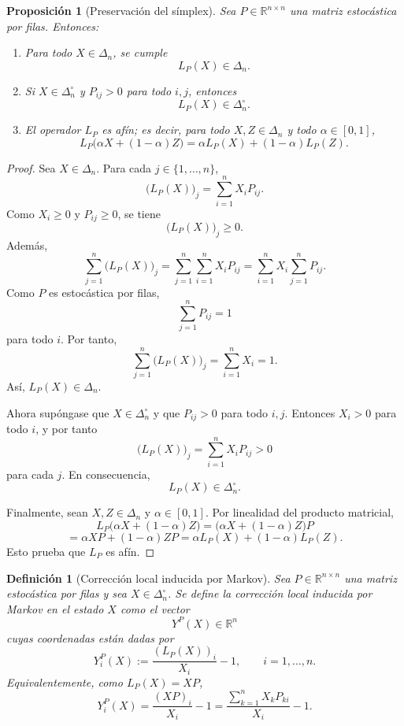 \documentclass[12pt]{article}
\newtheorem{definicion}{Definición}[section]
\newtheorem{proposicion}{Proposición}[section]
\begin{document}
\begin{proposicion}[Preservación del símplex]
Sea \(P\in\mathbb{R}^{n\times n}\) una matriz estocástica por filas. Entonces:

\begin{enumerate}[label=\textnormal{(\roman*)}]
    \item Para todo \(X\in\Delta_n\), se cumple
    \[
    L_P(X)\in\Delta_n.
    \]

    \item Si \(X\in\Delta_n^\circ\) y \(P_{ij}>0\) para todo \(i,j\), entonces
    \[
    L_P(X)\in\Delta_n^\circ.
    \]

    \item El operador \(L_P\) es afín; es decir, para todo
    \(X,Z\in\Delta_n\) y todo \(\alpha\in[0,1]\),
    \[
    L_P\bigl(\alpha X+(1-\alpha)Z\bigr)
    =
    \alpha L_P(X)+(1-\alpha)L_P(Z).
    \]
\end{enumerate}
\end{proposicion}

\begin{proof}
Sea \(X\in\Delta_n\). Para cada \(j\in\{1,\dots,n\}\),
\[
\bigl(L_P(X)\bigr)_j
=
\sum_{i=1}^{n}X_iP_{ij}.
\]
Como \(X_i\geq 0\) y \(P_{ij}\geq 0\), se tiene
\[
\bigl(L_P(X)\bigr)_j\geq 0.
\]
Además,
\[
\sum_{j=1}^{n}\bigl(L_P(X)\bigr)_j
=
\sum_{j=1}^{n}\sum_{i=1}^{n}X_iP_{ij}
=
\sum_{i=1}^{n}X_i\sum_{j=1}^{n}P_{ij}.
\]
Como \(P\) es estocástica por filas,
\[
\sum_{j=1}^{n}P_{ij}=1
\]
para todo \(i\). Por tanto,
\[
\sum_{j=1}^{n}\bigl(L_P(X)\bigr)_j
=
\sum_{i=1}^{n}X_i
=
1.
\]
Así, \(L_P(X)\in\Delta_n\).

Ahora supóngase que \(X\in\Delta_n^\circ\) y que \(P_{ij}>0\) para todo \(i,j\).
Entonces \(X_i>0\) para todo \(i\), y por tanto
\[
\bigl(L_P(X)\bigr)_j
=
\sum_{i=1}^{n}X_iP_{ij}
>
0
\]
para cada \(j\). En consecuencia,
\[
L_P(X)\in\Delta_n^\circ.
\]

Finalmente, sean \(X,Z\in\Delta_n\) y \(\alpha\in[0,1]\). Por linealidad del producto
matricial,
\[
L_P\bigl(\alpha X+(1-\alpha)Z\bigr)
=
\bigl(\alpha X+(1-\alpha)Z\bigr)P
\]
\[
=
\alpha XP+(1-\alpha)ZP
=
\alpha L_P(X)+(1-\alpha)L_P(Z).
\]
Esto prueba que \(L_P\) es afín.
\end{proof}

\begin{definicion}[Corrección local inducida por Markov]
Sea \(P\in\mathbb{R}^{n\times n}\) una matriz estocástica por filas y sea
\(X\in\Delta_n^\circ\). Se define la \emph{corrección local inducida por Markov}
en el estado \(X\) como el vector
\[
Y^P(X)\in\mathbb{R}^n
\]
cuyas coordenadas están dadas por
\[
Y_i^P(X)
:=
\frac{(L_P(X))_i}{X_i}-1,
\qquad i=1,\dots,n.
\]
Equivalentemente, como \(L_P(X)=XP\),
\[
Y_i^P(X)
=
\frac{(XP)_i}{X_i}-1
=
\frac{\sum_{k=1}^{n}X_kP_{ki}}{X_i}-1.
\]
\end{definicion}
\end{document}
